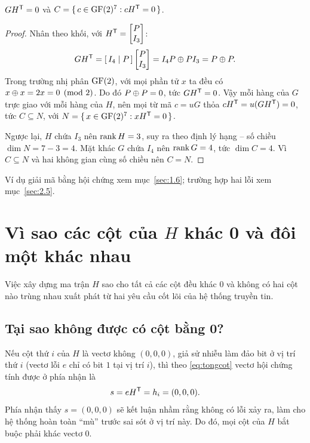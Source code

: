 \begin{menhde}\label{md:GHT}
$GH^{\mathsf{T}} = 0$ và $C = \{\, c \in \mathrm{GF}(2)^{7} : cH^{\mathsf{T}} = 0 \,\}$.
\end{menhde}
\begin{proof}
Nhân theo khối, với $H^{\mathsf{T}} = \begin{bmatrix} P \\ I_3 \end{bmatrix}$:
\[
  GH^{\mathsf{T}} = [\,I_4 \mid P\,]\begin{bmatrix} P \\ I_3 \end{bmatrix}
       = I_4 P \oplus P I_3 = P \oplus P .
\]
Trong trường nhị phân $\mathrm{GF}(2)$, với mọi phần tử $x$ ta đều có
$x \oplus x = 2x = 0 \pmod 2$. Do đó $P \oplus P = 0$, tức $GH^{\mathsf{T}} = 0$. Vậy mỗi hàng
của $G$ trực giao với mỗi hàng của $H$, nên mọi từ mã $c = uG$ thỏa
$cH^{\mathsf{T}} = u(GH^{\mathsf{T}}) = 0$, tức $C \subseteq N$, với
$N = \{\, x \in \mathrm{GF}(2)^{7} : xH^{\mathsf{T}} = 0 \,\}$.

Ngược lại, $H$ chứa $I_3$ nên $\operatorname{rank} H = 3$, suy ra theo định lý hạng -- số
chiều $\dim N = 7 - 3 = 4$. Mặt khác $G$ chứa $I_4$ nên $\operatorname{rank} G = 4$, tức
$\dim C = 4$. Vì $C \subseteq N$ và hai không gian cùng số chiều nên
$C = N$.
\end{proof}

Ví dụ giải mã bằng hội chứng xem mục~\ref{sec:1.6}; trường hợp hai lỗi xem
mục~\ref{sec:2.5}.

\section{Vì sao các cột của \texorpdfstring{$H$}{H} khác 0 và đôi một khác nhau}
\label{sec:2.3}

Việc xây dựng ma trận $H$ sao cho tất cả các cột đều khác $0$ và không có hai
cột nào trùng nhau xuất phát từ hai yêu cầu cốt lõi của hệ thống truyền tin.

\subsection{Tại sao không được có cột bằng 0?}
\label{ss:2.3.1}

Nếu cột thứ $i$ của $H$ là vectơ không $(0,0,0)$, giả sử nhiễu làm đảo bit ở vị
trí thứ $i$ (vectơ lỗi $e$ chỉ có bit $1$ tại vị trí $i$), thì theo
\eqref{eq:tongcot} vectơ hội chứng tính được ở phía nhận là
\[
  s = eH^{\mathsf{T}} = h_i = (0,0,0) .
\]
Phía nhận thấy $s = (0,0,0)$ sẽ kết luận nhầm rằng không có lỗi xảy ra, làm cho
hệ thống hoàn toàn ``mù'' trước sai sót ở vị trí này. Do đó, mọi cột của $H$
bắt buộc phải khác vectơ $0$.

